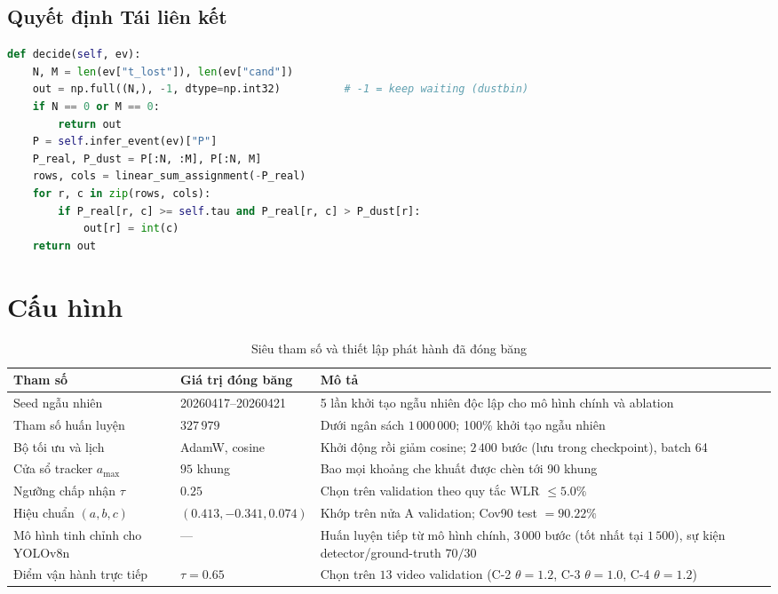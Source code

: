 \section{Quyết định Tái liên kết}
\begin{lstlisting}[language=Python, caption={Chỉ chấp nhận liên kết khi vượt ngưỡng và vượt dustbin}, label={lst:decide}]
def decide(self, ev):
    N, M = len(ev["t_lost"]), len(ev["cand"])
    out = np.full((N,), -1, dtype=np.int32)          # -1 = keep waiting (dustbin)
    if N == 0 or M == 0:
        return out
    P = self.infer_event(ev)["P"]
    P_real, P_dust = P[:N, :M], P[:N, M]
    rows, cols = linear_sum_assignment(-P_real)
    for r, c in zip(rows, cols):
        if P_real[r, c] >= self.tau and P_real[r, c] > P_dust[r]:
            out[r] = int(c)
    return out
\end{lstlisting}

\chapter{Cấu hình}
\label{app:hyperparameters}

\begin{table}[H]
    \centering\small
    \caption{Siêu tham số và thiết lập phát hành đã đóng băng}
    \label{tab:hyperparameters}
    \begin{tabularx}{\textwidth}{l l X}
        \toprule
        \textbf{Tham số} & \textbf{Giá trị đóng băng} & \textbf{Mô tả} \\
        \midrule
        Seed ngẫu nhiên & 20260417--20260421 & 5 lần khởi tạo ngẫu nhiên độc lập cho mô hình chính và ablation \\
        Tham số huấn luyện & $327\,979$ & Dưới ngân sách $1\,000\,000$; 100\% khởi tạo ngẫu nhiên \\
        Bộ tối ưu và lịch & AdamW, cosine & Khởi động rồi giảm cosine; $2\,400$ bước (lưu trong checkpoint), batch 64 \\
        Cửa sổ tracker $a_{\max}$ & $95$ khung & Bao mọi khoảng che khuất được chèn tới 90 khung \\
        Ngưỡng chấp nhận $\tau$ & $0.25$ & Chọn trên validation theo quy tắc WLR $\le 5.0\%$ \\
        Hiệu chuẩn $(a, b, c)$ & $(0.413, -0.341, 0.074)$ & Khớp trên nửa A validation; Cov90 test $= 90.22\%$ \\
        \midrule
        Mô hình tinh chỉnh cho YOLOv8n & --- & Huấn luyện tiếp từ mô hình chính, $3\,000$ bước (tốt nhất tại $1\,500$), sự kiện detector/ground-truth $70/30$ \\
        Điểm vận hành trực tiếp & $\tau=0.65$ & Chọn trên $13$ video validation (C-2 $\theta=1.2$, C-3 $\theta=1.0$, C-4 $\theta=1.2$) \\
        \bottomrule
    \end{tabularx}
\end{table}

